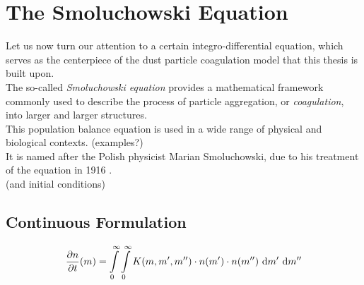 \section{The Smoluchowski Equation}

    Let us now turn our attention to a certain integro-differential equation, which serves as the
    centerpiece of the dust particle coagulation model that this thesis is built upon. \\

    The so-called \textit{Smoluchowski equation} provides a mathematical framework commonly used 
    to describe the process of particle aggregation, or \textit{coagulation}, into larger and 
    larger structures. \\

    This population balance equation is used in a wide range of physical and biological contexts. 
    (examples?) \\

    It is named after the Polish physicist Marian Smoluchowski, due to his treatment of the 
    equation in 1916 \cite{smoluchowski_1916}. \\

    (and initial conditions)

    \subsection{Continuous Formulation}

    
        \begin{equation}
            \label{eq:continuous_smoluchowski_equation}
            \frac{\partial n}{\partial t}(m)
                =
                    \int\limits_0^\infty
                    \int\limits_0^\infty
                    K(m,m',m'')
                    \cdot n(m')
                    \cdot n(m'')
                    \ \text{d} m'
                    \ \text{d} m''
        \end{equation}

         \\

